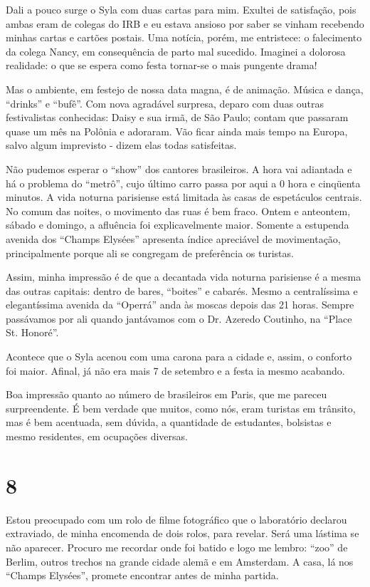 Dali a pouco surge o Syla com duas cartas para mim. Exultei de satisfação, pois ambas eram de colegas do IRB e eu estava ansioso por saber se vinham recebendo minhas cartas e cartões postais. Uma notícia, porém, me entristece: o falecimento da colega Nancy, em consequência de parto mal sucedido. Imaginei a dolorosa realidade: o que se espera como festa tornar-se o mais pungente drama!

Mas o ambiente, em festejo de nossa data magna, é de animação. Música e dança, ``drinks'' e ``bufê''. Com nova agradável surpresa, deparo com duas outras festivalistas conhecidas: Daisy e sua irmã, de São Paulo; contam que passaram quase um mês na Polônia e adoraram. Vão ficar ainda mais tempo na Europa, salvo algum imprevisto - dizem elas todas satisfeitas.

Não pudemos esperar o ``show'' dos cantores brasileiros. A hora vai adiantada e há o problema do ``metrô'', cujo último carro passa por aqui a 0 hora e cinqüenta minutos. A vida noturna parisiense está limitada às casas de espetáculos centrais. No comum das noites, o movimento das ruas é bem fraco. Ontem e anteontem, sábado e domingo, a afluência foi explicavelmente maior. Somente a estupenda avenida dos ``Champs Elysées'' apresenta índice apreciável de movimentação, principalmente porque ali se congregam de preferência os turistas.

Assim, minha impressão é de que a decantada vida noturna parisiense é a mesma das outras capitais: dentro de bares, ``boites'' e cabarés. Mesmo a centralíssima e elegantíssima avenida da ``Operrá'' anda às moscas depois das 21 horas. Sempre passávamos por ali quando jantávamos com o Dr. Azeredo Coutinho, na ``Place St. Honoré''.

Acontece que o Syla acenou com uma carona para a cidade e, assim, o conforto foi maior. Afinal, já não era mais 7 de setembro e a festa ia mesmo acabando.

Boa impressão quanto ao número de brasileiros em Paris, que me pareceu surpreendente. É bem verdade que muitos, como nós, eram turistas em trânsito, mas é bem acentuada, sem dúvida, a quantidade de estudantes, bolsistas e mesmo residentes, em ocupações diversas.

\section*{8 \adfflatleafright {}}
Estou preocupado com um rolo de filme fotográfico que o laboratório declarou extraviado, de minha encomenda de dois rolos, para revelar. Será uma lástima se não aparecer. Procuro me recordar onde foi batido e logo me lembro: ``zoo'' de Berlim, outros trechos na grande cidade alemã e em Amsterdam. A casa, lá nos ``Champs Elysées'', promete encontrar antes de minha partida.

